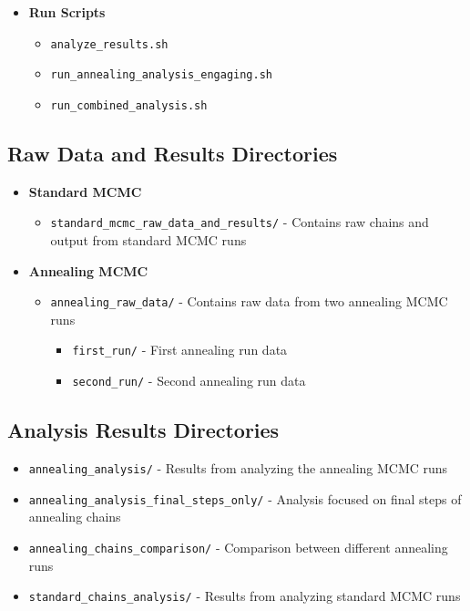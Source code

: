 \documentclass[11pt]{article}
\begin{document}
\begin{itemize}
    \item \textbf{Run Scripts}
    \begin{itemize}
        \item \texttt{analyze\_results.sh}
        \item \texttt{run\_annealing\_analysis\_engaging.sh}
        \item \texttt{run\_combined\_analysis.sh}
    \end{itemize}
\end{itemize}

\subsection{Raw Data and Results Directories}

\begin{itemize}
    \item \textbf{Standard MCMC}
    \begin{itemize}
        \item \texttt{standard\_mcmc\_raw\_data\_and\_results/} - Contains raw chains and output from standard MCMC runs
    \end{itemize}
    
    \item \textbf{Annealing MCMC}
    \begin{itemize}
        \item \texttt{annealing\_raw\_data/} - Contains raw data from two annealing MCMC runs
        \begin{itemize}
            \item \texttt{first\_run/} - First annealing run data
            \item \texttt{second\_run/} - Second annealing run data
        \end{itemize}
    \end{itemize}
\end{itemize}

\subsection{Analysis Results Directories}

\begin{itemize}
    \item \texttt{annealing\_analysis/} - Results from analyzing the annealing MCMC runs
    \item \texttt{annealing\_analysis\_final\_steps\_only/} - Analysis focused on final steps of annealing chains
    \item \texttt{annealing\_chains\_comparison/} - Comparison between different annealing runs
    \item \texttt{standard\_chains\_analysis/} - Results from analyzing standard MCMC runs
\end{itemize}
\end{document}
